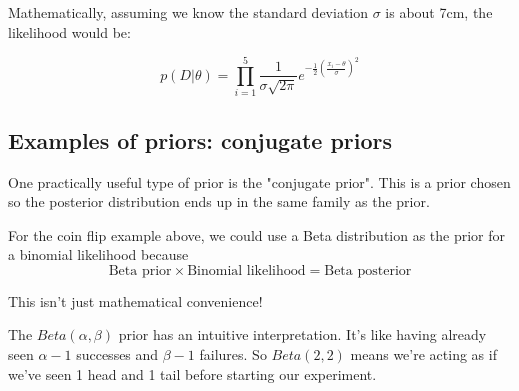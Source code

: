 Mathematically, assuming we know the standard deviation $\sigma$ is about 7cm, the likelihood would be:

$$
p(D|\theta) = 
\prod_{i=1}^{5} \frac{1}{\sigma \sqrt{2\pi}} e^{-\frac{1}{2} \left(\frac{x_i - \theta}{\sigma}\right)^2 }
$$


\subsection{Examples of priors: conjugate priors}

One practically useful type of prior is the "conjugate prior".
This is a prior chosen so the posterior distribution ends up in the same family as the prior.

For the coin flip example above, we could use a Beta distribution as the prior for a
binomial likelihood because
$$
\text{Beta prior} \times \text{Binomial likelihood} = \text{Beta posterior}
$$

This isn't just mathematical convenience!

The $Beta(\alpha, \beta)$ prior has an intuitive interpretation.
It's like having already seen $\alpha -1$ successes and $\beta -1$ failures.
So $Beta(2, 2)$ means we're acting as if we've seen 1 head and 1 tail before starting our experiment.